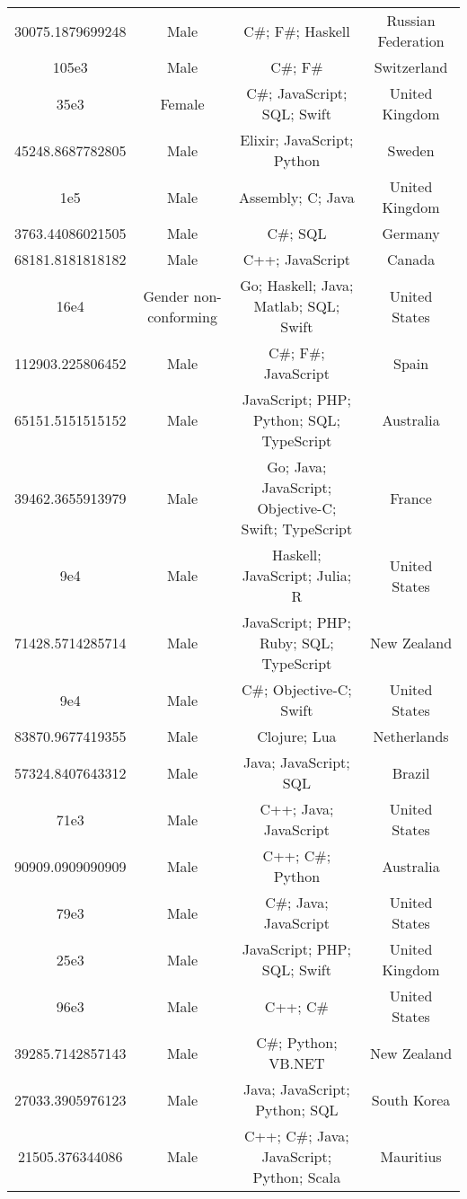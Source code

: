 \begin{center}
\begin{tabular}{ |c|c|c|c| }
30075.1879699248  &  Male  &  C\#; F\#; Haskell  &  Russian Federation  \\ 
105e3  &  Male  &  C\#; F\#  &  Switzerland  \\ 
35e3  &  Female  &  C\#; JavaScript; SQL; Swift  &  United Kingdom  \\ 
45248.8687782805  &  Male  &  Elixir; JavaScript; Python  &  Sweden  \\ 
1e5  &  Male  &  Assembly; C; Java  &  United Kingdom  \\ 
3763.44086021505  &  Male  &  C\#; SQL  &  Germany  \\ 
68181.8181818182  &  Male  &  C++; JavaScript  &  Canada  \\ 
16e4  &  Gender non-conforming  &  Go; Haskell; Java; Matlab; SQL; Swift  &  United States  \\ 
112903.225806452  &  Male  &  C\#; F\#; JavaScript  &  Spain  \\ 
65151.5151515152  &  Male  &  JavaScript; PHP; Python; SQL; TypeScript  &  Australia  \\ 
39462.3655913979  &  Male  &  Go; Java; JavaScript; Objective-C; Swift; TypeScript  &  France  \\ 
9e4  &  Male  &  Haskell; JavaScript; Julia; R  &  United States  \\ 
71428.5714285714  &  Male  &  JavaScript; PHP; Ruby; SQL; TypeScript  &  New Zealand  \\ 
9e4  &  Male  &  C\#; Objective-C; Swift  &  United States  \\ 
83870.9677419355  &  Male  &  Clojure; Lua  &  Netherlands  \\ 
57324.8407643312  &  Male  &  Java; JavaScript; SQL  &  Brazil  \\ 
71e3  &  Male  &  C++; Java; JavaScript  &  United States  \\ 
90909.0909090909  &  Male  &  C++; C\#; Python  &  Australia  \\ 
79e3  &  Male  &  C\#; Java; JavaScript  &  United States  \\ 
25e3  &  Male  &  JavaScript; PHP; SQL; Swift  &  United Kingdom  \\ 
96e3  &  Male  &  C++; C\#  &  United States  \\ 
39285.7142857143  &  Male  &  C\#; Python; VB.NET  &  New Zealand  \\ 
27033.3905976123  &  Male  &  Java; JavaScript; Python; SQL  &  South Korea  \\ 
21505.376344086  &  Male  &  C++; C\#; Java; JavaScript; Python; Scala  &  Mauritius  \\ 

\end{tabular}
\end{center}
